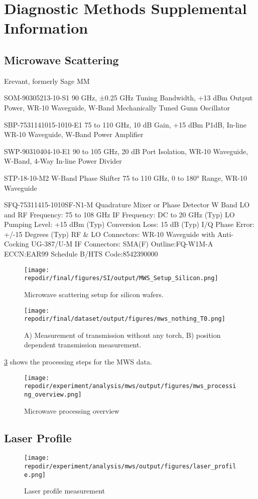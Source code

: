 \section{Diagnostic Methods Supplemental Information}

\subsection{Microwave Scattering}
Erevant, formerly Sage MM

SOM-90305213-10-S1
90 GHz, ±0.25 GHz Tuning Bandwidth, +13 dBm Output Power, WR-10 Waveguide, W-Band Mechanically Tuned Gunn Oscillator

SBP-7531141015-1010-E1
75 to 110 GHz, 10 dB Gain, +15 dBm P1dB, In-line WR-10 Waveguide, W-Band Power Amplifier

SWP-90310404-10-E1
90 to 105 GHz, 20 dB Port Isolation, WR-10 Waveguide, W-Band, 4-Way In-line Power Divider

STP-18-10-M2
W-Band Phase Shifter
75 to 110 GHz, 0 to 180° Range, WR-10 Waveguide

SFQ-75311415-1010SF-N1-M
Quadrature Mixer or Phase Detector W Band
LO and RF Frequency: 75 to 108 GHz
IF Frequency: DC to 20 GHz (Typ) 
LO Pumping Level: +15 dBm (Typ) 
Conversion Loss: 15 dB (Typ) 
I/Q Phase Error: +/-15 Degrees (Typ) 
RF & LO Connectors: WR-10 Waveguide with Anti-Cocking 
UG-387/U-M
IF Connectors: SMA(F) 
Outline:FQ-W1M-A
ECCN:EAR99
Schedule B/HTS Code:8542390000

\begin{figure}[]
\centering
\texttt{[image: \\repodir/final/figures/SI/output/MWS\_Setup\_Silicon.png]}
\caption{Microwave scattering setup for silicon wafers.}
\label{fig:SI_MWS_Setup_Silicon}
\end{figure}

\begin{figure}[]
\centering
\texttt{[image: \\repodir/final/dataset/output/figures/mws\_nothing\_T0.png]}
\caption{A) Measurement of transmission without any torch, B) position dependent transmission measurement.}
\label{fig:SI_MWS}
\end{figure}

\ref{fig:SI_mws_processing_overview} shows the processing steps for the MWS data. 



\begin{figure}[]
\centering
\texttt{[image: \\repodir/experiment/analysis/mws/output/figures/mws\_processing\_overview.png]}
\caption{Microwave processing overview}
\label{fig:SI_mws_processing_overview}
\end{figure}


\subsection{Laser Profile}


\begin{figure}[]
\centering
\texttt{[image: \\repodir/experiment/analysis/mws/output/figures/laser\_profile.png]}
\caption{Laser profile measurement}
\label{fig:SI_Laser_Profile}
\end{figure}